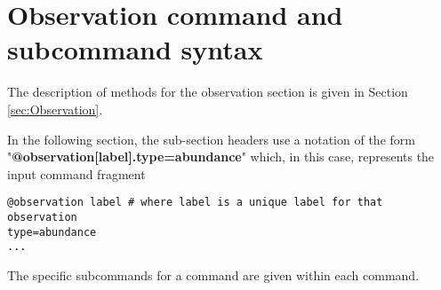 \subsection{}


\subsection{}


\subsection{}


\subsection{}


\subsection{}


\subsection{}


\section{Observation command and subcommand syntax\label{syntax:Observations}}

The description of methods for the observation section is given in Section \ref{sec:Observation}.

In the following section, the sub-section headers use a notation of the form "\textbf {@observation[label].type=abundance}" which, in this case, represents the input command fragment
{\small{\begin{verbatim}
@observation label # where label is a unique label for that observation
type=abundance
...
\end{verbatim}}}
The specific subcommands for a command are given within each command.

